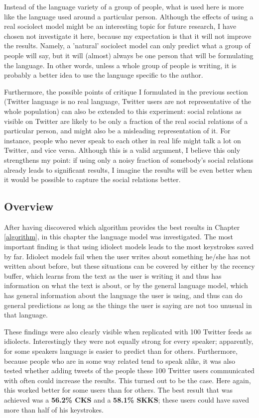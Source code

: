 \documentclass[11pt]{article}
\begin{document}
Instead of the language variety of a group of people, what is used here is more like the language used around a particular person. Although the effects of using a real sociolect model might be an interesting topic for future research, I have chosen not investigate it here, because my expectation is that it will not improve the results. Namely, a 'natural' sociolect model can only predict what a group of people will say, but it will (almost) always be one person that will be formulating the language. In other words, unless a whole group of people is writing, it is probably a better idea to use the language specific to the author.


Furthermore, the possible points of critique I formulated in the previous section (Twitter language is no real language, Twitter users are not representative of the whole population) can also be extended to this experiment: social relations as visible on Twitter are likely to be only a fraction of the real social relations of a particular person, and might also be a misleading representation of it. For instance, people who never speak to each other in real life might talk a lot on Twitter, and vice versa. Although this is a valid argument, I believe this only strengthens my point: if using only a noisy fraction of somebody's social relations already leads to significant results, I imagine the results will be even better when it would be possible to capture the social relations better.

\subsection{Overview}
After having discovered which algorithm provides the best results in Chapter \ref{algorithm}, in this chapter the language model was investigated. The most important finding is that using idiolect models leads to the most keystrokes saved by far. Idiolect models fail when the user writes about something he/she has not written about before, but these situations can be covered by either by the recency buffer, which learns from the text as the user is writing it and thus has information on what the text is about, or by the general language model, which has general information about the language the user is using, and thus can do general predictions as long as the things the user is saying are not too unusual in that language. 

These findings were also clearly visible when replicated with 100 Twitter feeds as idiolects. Interestingly they were not equally strong for every speaker; apparently, for some speakers language is easier to predict than for others. Furthermore, because people who are in some way related tend to speak alike, it was also tested whether adding tweets of the people these 100 Twitter users communicated with often could increase the results. This turned out to be the case. Here again, this worked better for some users than for others. The best result that was achieved was a \textbf{56.2\% CKS} and a \textbf{58.1\% SKKS}; these users could have saved more than half of his keystrokes.
\end{document}

